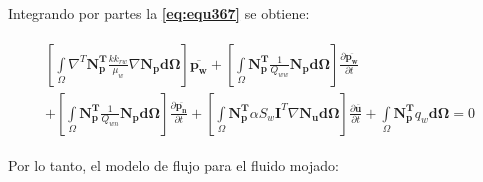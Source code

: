 \bigskip
Integrando por partes la \textbf{\ref{eq:equ367}} se obtiene:\bigskip

\begin{ceqn} 
\begin{gather} \label{eq:equ368} 
\begin{multlined}
\left[\int\limits_\Omega \nabla^T\mathbf{N_{p}^T} \frac{k k_{rw}}{\mu_{w}}\nabla \mathbf{N_p} \mathbf{d\Omega}\right]\mathbf{\overline{p_w}}  + \left[\int\limits_\Omega \mathbf{N_{p}^T}\frac{1}{Q_{ww}}\mathbf{N_p}\mathbf{d\Omega}\right]\frac{\partial \mathbf{\overline{p_w}}}{\partial t}\\[12pt] 
+ \left[\int\limits_\Omega \mathbf{N_{p}^T}\frac{1}{Q_{wn}}\mathbf{N_p}\mathbf{d\Omega}\right]\frac{\partial \mathbf{\overline{p_n}}}{\partial t} + \left[\int\limits_\Omega \mathbf{N_{p}^T}\alpha S_w\mathbf{I}^T\nabla\mathbf{N_u}\mathbf{d\Omega}\right]\frac{\partial  \mathbf{\overline{u}}}{\partial t} + \int\limits_\Omega \mathbf{N_{p}^T}q_w \mathbf{d\Omega} = 0
\end{multlined}
\end{gather} 
\end{ceqn}

\bigskip
Por lo tanto, el modelo de flujo para el fluido mojado:

